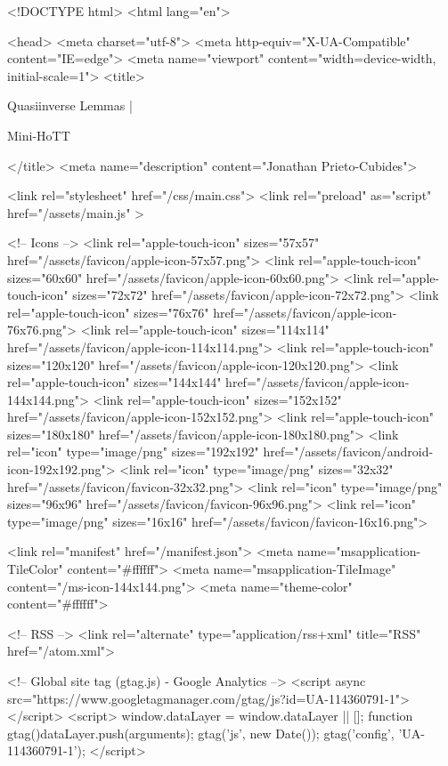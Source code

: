 <!DOCTYPE html>
<html lang="en">

<head>
  <meta charset="utf-8">
  <meta http-equiv="X-UA-Compatible" content="IE=edge">
  <meta name="viewport" content="width=device-width, initial-scale=1">
  <title>
    
      
        Quasiinverse Lemmas |
      
        Mini-HoTT
    
  </title>
  <meta name="description" content="Jonathan Prieto-Cubides">

  <link rel="stylesheet" href="/css/main.css">
  <link rel="preload" as="script" href="/assets/main.js" >

  <!-- Icons -->
  <link rel="apple-touch-icon" sizes="57x57" href="/assets/favicon/apple-icon-57x57.png">
  <link rel="apple-touch-icon" sizes="60x60" href="/assets/favicon/apple-icon-60x60.png">
  <link rel="apple-touch-icon" sizes="72x72" href="/assets/favicon/apple-icon-72x72.png">
  <link rel="apple-touch-icon" sizes="76x76" href="/assets/favicon/apple-icon-76x76.png">
  <link rel="apple-touch-icon" sizes="114x114" href="/assets/favicon/apple-icon-114x114.png">
  <link rel="apple-touch-icon" sizes="120x120" href="/assets/favicon/apple-icon-120x120.png">
  <link rel="apple-touch-icon" sizes="144x144" href="/assets/favicon/apple-icon-144x144.png">
  <link rel="apple-touch-icon" sizes="152x152" href="/assets/favicon/apple-icon-152x152.png">
  <link rel="apple-touch-icon" sizes="180x180" href="/assets/favicon/apple-icon-180x180.png">
  <link rel="icon" type="image/png" sizes="192x192"  href="/assets/favicon/android-icon-192x192.png">
  <link rel="icon" type="image/png" sizes="32x32" href="/assets/favicon/favicon-32x32.png">
  <link rel="icon" type="image/png" sizes="96x96" href="/assets/favicon/favicon-96x96.png">
  <link rel="icon" type="image/png" sizes="16x16" href="/assets/favicon/favicon-16x16.png">

  <link rel="manifest" href="/manifest.json">
  <meta name="msapplication-TileColor" content="#ffffff">
  <meta name="msapplication-TileImage" content="/ms-icon-144x144.png">
  <meta name="theme-color" content="#ffffff">

  <!-- RSS -->
  <link rel="alternate" type="application/rss+xml" title="RSS" href="/atom.xml">

  <!-- Global site tag (gtag.js) - Google Analytics -->
  <script async src="https://www.googletagmanager.com/gtag/js?id=UA-114360791-1"></script>
  <script>
    window.dataLayer = window.dataLayer || [];
    function gtag(){dataLayer.push(arguments);}
    gtag('js', new Date());
    gtag('config', 'UA-114360791-1');
  </script>

